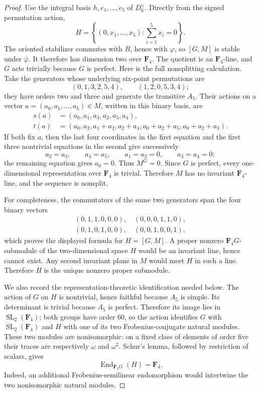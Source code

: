 \documentclass[11pt]{article}
\theoremstyle{definition}
\theoremstyle{remark}
\newcommand{\F}{\mathbf F}
\newcommand{\End}{\operatorname{End}}
\begin{document}
\begin{proof}
Use the integral basis \(h,e_1,\ldots,e_5\) of \(D_6^\vee\).  Directly from
the signed permutation action,
\[
 H=\left\{(0,x_1,\ldots,x_5):
                   \sum_{i=1}^5x_i=0\right\}.
\]
The oriented stabilizer commutes with \(B\), hence with \(\varphi\), so
\([G,M]\) is stable under \(\bar\varphi\).  It therefore has dimension two
over \(\F_4\).
The quotient is an \(\F_4\)-line, and \(G\) acts trivially because \(G\) is
perfect.  Here is the full nonsplitting calculation.  Take the generators
whose underlying six-point permutations are
\[
 (0,1,3,2,5,4),\qquad (1,2,0,5,3,4);
\]
they have orders two and three and generate the transitive \(A_5\).  Their
actions on a vector
\(a=(a_0,a_1,\ldots,a_5)\in M\), written in this binary basis, are
\[
\begin{aligned}
 s(a)&=(a_0,a_1,a_3,a_2,a_5,a_4),\\
 t(a)&=(a_0,a_2,a_1+a_2,a_2+a_4,
              a_0+a_2+a_5,a_0+a_2+a_3).
\end{aligned}
\]
If both fix \(a\), then the last four coordinates in the first equation and
the first three nontrivial equations in the second give successively
\[
 a_2=a_3,\qquad a_4=a_5,\qquad
 a_1=a_2=0,\qquad a_3=a_4=0;
\]
the remaining equation gives \(a_0=0\).  Thus \(M^G=0\).  Since \(G\) is
perfect, every one-dimensional representation over \(\F_4\) is trivial.
Therefore \(M\) has no invariant \(\F_4\)-line, and the sequence is
nonsplit.

For completeness, the commutators of the same two generators span the four
binary vectors
\[
\begin{gathered}
 (0,1,1,0,0,0),\quad (0,0,0,1,1,0),\\
 (0,1,0,1,0,0),\quad (0,0,1,0,0,1),
\end{gathered}
\]
which proves the displayed formula for \(H=[G,M]\).  A proper nonzero
\(\F_4G\)-submodule of the two-dimensional space \(H\) would be an invariant
line, hence cannot exist.  Any second invariant plane in \(M\) would meet
\(H\) in such a line.  Therefore \(H\) is the unique nonzero proper
submodule.

We also record the representation-theoretic identification needed below.
The action of \(G\) on \(H\) is nontrivial, hence faithful because \(A_5\) is
simple.  Its determinant is trivial because \(A_5\) is perfect.  Therefore
its image lies in \(\operatorname{SL}_2(\F_4)\); both groups have order
\(60\), so the action identifies \(G\) with
\(\operatorname{SL}_2(\F_4)\) and \(H\) with one of its two
Frobenius-conjugate natural modules.  These two modules are nonisomorphic:
on a fixed class of elements of order five their traces are respectively
\(\omega\) and \(\omega^2\).  Schur's lemma, followed by restriction of
scalars, gives
\[
                         \End_{\F_2G}(H)=\F_4.
\]
Indeed, an additional Frobenius-semilinear endomorphism would intertwine the
two nonisomorphic natural modules.


\end{proof}
\end{document}
